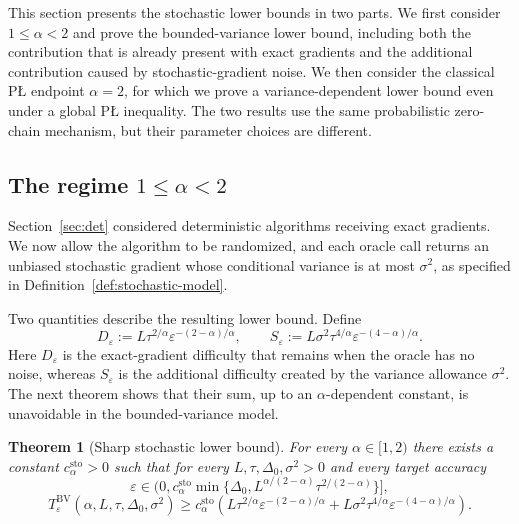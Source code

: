 \documentclass[11pt]{article}
\newtheorem{theorem}{Theorem}[section]
\begin{document}
This section presents the stochastic lower bounds in two parts. We first consider \(1\le\alpha<2\) and prove the bounded-variance lower bound, including both the contribution that is already present with exact gradients and the
additional contribution caused by stochastic-gradient noise. We then consider the classical P\L{} endpoint
\(\alpha=2\), for which we prove a variance-dependent lower bound even under a global P\L{}
inequality. The two results use the same
probabilistic zero-chain mechanism, but their parameter choices are different.

\subsection{The regime \texorpdfstring{\(1\le\alpha<2\)}{1 <= alpha < 2}}
\label{sec:stochastic-alpha-lt-two}

Section~\ref{sec:det} considered deterministic algorithms receiving exact gradients. We now allow the algorithm to be
randomized, and each oracle call returns an unbiased stochastic gradient whose conditional variance is at most
\(\sigma^2\), as specified in Definition~\ref{def:stochastic-model}.

Two quantities describe the resulting lower bound. Define
\[
D_\varepsilon
:=
L\tau^{2/\alpha}\varepsilon^{-(2-\alpha)/\alpha},
\qquad
S_\varepsilon
:=
L\sigma^2\tau^{4/\alpha}\varepsilon^{-(4-\alpha)/\alpha}.
\]
Here \(D_\varepsilon\) is the exact-gradient difficulty that remains when the oracle has no noise, whereas
\(S_\varepsilon\) is the additional difficulty created by the variance allowance \(\sigma^2\). The next theorem shows
that their sum, up to an \(\alpha\)-dependent constant, is unavoidable in the bounded-variance model.

\begin{theorem}[Sharp stochastic lower bound]
\label{thm:stochastic-matching}
For every $\alpha\in[1,2)$ there exists a constant $c_\alpha^{\mathrm{sto}}>0$ such that for every
$L,\tau,\Delta_0,\sigma^2>0$ and every target accuracy
\[
\varepsilon\in\bigl(0,c_\alpha^{\mathrm{sto}}\min\{\Delta_0,L^{\alpha/(2-\alpha)}\tau^{2/(2-\alpha)}\}\bigr],
\]
\[
T_\varepsilon^{\mathrm{BV}}(\alpha,L,\tau,\Delta_0,\sigma^2)
\ge
c_\alpha^{\mathrm{sto}}\left(
L\tau^{2/\alpha}\varepsilon^{-(2-\alpha)/\alpha}
 + L\sigma^2\tau^{4/\alpha}\varepsilon^{-(4-\alpha)/\alpha}
\right).
\]
\end{theorem}
\end{document}
